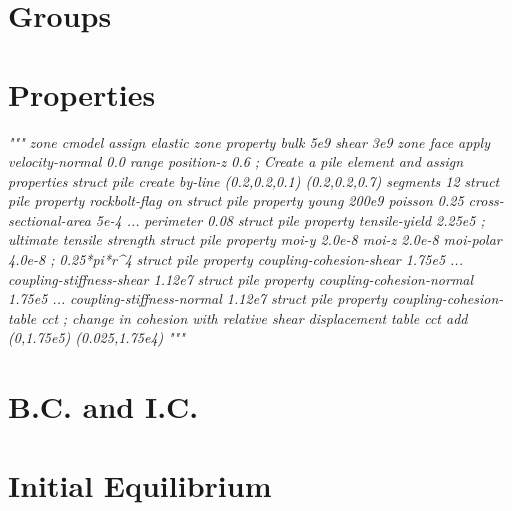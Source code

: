 \documentclass[a4paper, nobind]{templates/ociamthesis}
\newenvironment{Shaded}{\begin{snugshade}}{\end{snugshade}}
\newcommand{\CommentTok}[1]{\textcolor[rgb]{0.56,0.35,0.01}{\textit{#1}}}
\renewenvironment{Shaded}
{
  \vspace{10pt}%
  \begin{snugshade}%
}{%
  \end{snugshade}%
  \vspace{8pt}%
}
\begin{document}
\hypertarget{groups-3}{%
\section{Groups}\label{groups-3}}

\hypertarget{properties-3}{%
\section{Properties}\label{properties-3}}

\begin{Shaded}
\begin{Highlighting}[]
\CommentTok{"""}
\CommentTok{zone cmodel assign elastic}
\CommentTok{zone property bulk 5e9 shear 3e9}
\CommentTok{zone face apply velocity{-}normal 0.0 range position{-}z 0.6}
\CommentTok{; Create a pile element and assign properties}
\CommentTok{struct pile create by{-}line (0.2,0.2,0.1) (0.2,0.2,0.7) segments 12}
\CommentTok{struct pile property rockbolt{-}flag on}
\CommentTok{struct pile property young 200e9 poisson 0.25 cross{-}sectional{-}area 5e{-}4 ...}
\CommentTok{                     perimeter 0.08}
\CommentTok{struct pile property tensile{-}yield   2.25e5  ; ultimate tensile strength}
\CommentTok{struct pile property moi{-}y 2.0e{-}8 moi{-}z 2.0e{-}8 moi{-}polar 4.0e{-}8 ; 0.25*pi*r\^{}4}
\CommentTok{struct pile property coupling{-}cohesion{-}shear 1.75e5 ...}
\CommentTok{                     coupling{-}stiffness{-}shear 1.12e7}
\CommentTok{struct pile property coupling{-}cohesion{-}normal 1.75e5 ...}
\CommentTok{                     coupling{-}stiffness{-}normal 1.12e7}
\CommentTok{struct pile property coupling{-}cohesion{-}table \textquotesingle{}cct\textquotesingle{}}
\CommentTok{; change in cohesion with relative shear displacement}
\CommentTok{table \textquotesingle{}cct\textquotesingle{} add (0,1.75e5) (0.025,1.75e4)}
\CommentTok{"""}
\end{Highlighting}
\end{Shaded}

\hypertarget{b.c.-and-i.c.-2}{%
\section{B.C. and I.C.}\label{b.c.-and-i.c.-2}}

\hypertarget{initial-equilibrium-2}{%
\section{Initial Equilibrium}\label{initial-equilibrium-2}}
\end{document}
